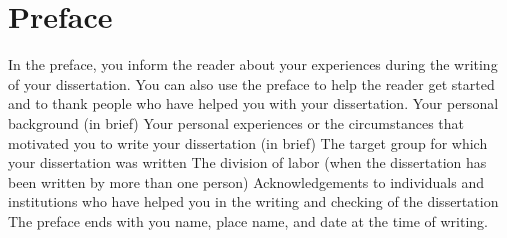 \chapter*{Preface}
\label{chap:preface}
In the preface, you inform the reader about your experiences during the writing of your dissertation. You can also use the preface to help the reader get started and to thank people who have helped you with your dissertation.
Your personal background (in brief)
Your personal experiences or the circumstances that motivated you to write your dissertation (in brief)
The target group for which your dissertation was written
The division of labor (when the dissertation has been written by more than one person)
Acknowledgements to individuals and institutions who have helped you in the writing and checking of the dissertation
The preface ends with you name,  place name, and date at the time of writing.
